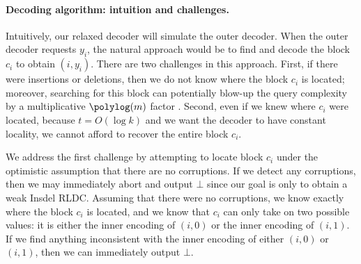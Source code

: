 \paragraph{Decoding algorithm: intuition and challenges.}
Intuitively, our relaxed decoder will simulate the outer decoder. 
When the outer decoder requests $y_i$, the natural approach would be to find and decode the block $c_i$ to obtain $(i,y_i)$. 
There are two challenges in this approach. 
First, if there were insertions or deletions, then we do not know where the block $c_i$ is located; moreover, searching for this block can potentially blow-up the query complexity by a multiplicative $\polylog(m)$ factor \cite{Ostrovsky-InsdelLDC-Compiler,BlockBGKZ20}. 
Second, even if we knew where $c_i$ were located, because $t = O(\log k)$ and we want the decoder to have constant locality, we cannot afford to recover the entire block $c_i$. 

We address the first challenge by attempting to locate block $c_i$ under the optimistic assumption that there are no corruptions. 
If we detect any corruptions, then we may immediately abort and output $\bot$ since our goal is only to obtain a weak Insdel RLDC. 
Assuming that there were no corruptions, we know exactly where the block $c_i$ is located, and we know that $c_i$ can only take on two possible values: it is either the inner encoding of $(i,0)$ or the inner encoding of $(i,1)$. 
If we find anything inconsistent with the inner encoding of either $(i,0)$ or $(i,1)$, then we can immediately output $\bot$.

